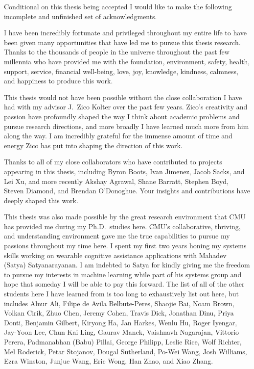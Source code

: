 \documentclass[12pt]{cmuthesis}
\begin{document}
\begin{acknowledgments}
  Conditional on this thesis being accepted I would like to
  make the following incomplete and unfinished
  set of acknowledgments. \vspace{6mm}

  I have been incredibly fortunate and privileged throughout
  my entire life to have been given many opportunities
  that have led me to pursue this thesis research.
  Thanks to the thousands of people in the universe throughout
  the past few millennia who have provided me with the
  foundation, environment, safety, health, support, service,
  financial well-being, love, joy, knowledge, kindness, calmness,
  and happiness to produce this work.

  This thesis would not have been possible without the close
  collaboration I have had with my advisor J.~Zico Kolter over
  the past few years.
  Zico's creativity and passion have profoundly shaped
  the way I think about academic problems and pursue
  research directions, and more broadly I have learned much
  more from him along the way.
  I am incredibly grateful for the immense
  amount of time and energy Zico has put into shaping the
  direction of this work.

  Thanks to all of my close collaborators who have contributed
  to projects appearing in this thesis, including
  Byron Boots, Ivan Jimenez, Jacob Sacks, and Lei Xu,
  and more recently
  Akshay Agrawal,
  Shane Barratt,
  Stephen Boyd,
  Steven Diamond,
  and Brendan O'Donoghue.
  Your insights and contributions have deeply
  shaped this work.

  This thesis was also made possible by the great research
  environment that CMU has provided me during my Ph.D.~studies here.
  CMU's collaborative, thriving, and understanding environment gave
  me the true capabilities to pursue my passions throughout my time here.
  I spent my first two years honing my systems skills working on
  wearable cognitive assistance applications with
  Mahadev (Satya) Satyanarayanan.
  I am indebted to Satya for
  kindly giving me the freedom to pursue my interests in
  machine learning while part of his systems group and
  hope that someday I will be able to pay this forward.
  The list of all of the other students here I have learned from
  is too long to exhaustively list out here, but includes
  Alnur Ali,
  Filipe de Avila Belbute-Peres,
  Shaojie Bai,
  Noam Brown,
  Volkan Cirik,
  Zhuo Chen,
  Jeremy Cohen,
  Travis Dick,
  Jonathan Dinu,
  Priya Donti,
  Benjamin Gilbert,
  Kiryong Ha,
  Jan Harkes,
  Wenlu Hu,
  Roger Iyengar,
  Jay-Yoon Lee,
  Chun Kai Ling,
  Gaurav Manek,
  Vaishnavh Nagarajan,
  Vittorio Perera,
  Padmanabhan (Babu) Pillai,
  George Philipp,
  Leslie Rice,
  Wolf Richter,
  Mel Roderick,
  Petar Stojanov,
  Dougal Sutherland,
  Po-Wei Wang,
  Josh Williams,
  Ezra Winston,
  Junjue Wang,
  Eric Wong,
  Han Zhao, and
  Xiao Zhang.


\end{acknowledgments}
\end{document}
